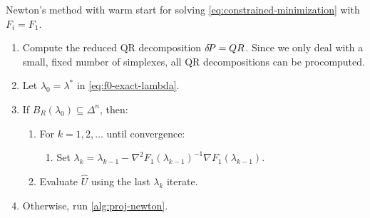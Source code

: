 \documentclass[eikonal.tex]{subfiles}
\begin{document}
\begin{algorithm}[H]
  \caption{Newton's method with warm start for solving
    \cref{eq:constrained-minimization} with
    $F_i = F_1$.}\label{alg:warm-start-newton}
  \begin{enumerate}[nolistsep]
  \item Compute the reduced QR decomposition ${\delta \hspace{-0.14em} P} = QR$. Since we
    only deal with a small, fixed number of simplexes, all QR
    decompositions can be procomputed.
  \item Let $\lambda_0 = \lambda^*$ in \cref{eq:f0-exact-lambda}.
  \item If $B_R(\lambda_0) \subseteq \Delta^n$, then:
    \begin{enumerate}[nolistsep]
    \item For $k = 1, 2, \hdots$ until convergence:
      \begin{enumerate}
      \item Set
        $\lambda_k = \lambda_{k-1} - \nabla^2
        F_1(\lambda_{k-1})^{-1} \nabla
        F_1(\lambda_{k-1})$.
      \end{enumerate}
    \item Evaluate $\hat{U}$ using the last $\lambda_k$ iterate.
    \end{enumerate}
  \item Otherwise, run \cref{alg:proj-newton}.
  \end{enumerate}
\end{algorithm}
\end{document}
